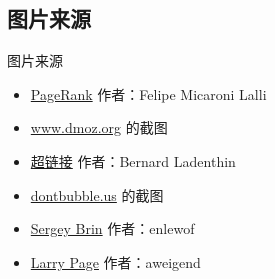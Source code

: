 \subsection{图片来源}
\begin{frame}{图片来源}
    \begin{itemize}
	\item \href{https://commons.wikimedia.org/wiki/File:PageRank-hi-res.png}{PageRank} 作者：Felipe Micaroni Lalli
	\item \href{http://www.dmoz.org}{www.dmoz.org} 的截图
	\item \href{https://commons.wikimedia.org/wiki/File:Hyperlink-Wikipedia.svg}{超链接} 作者：Bernard Ladenthin
	\item \href{http://dontbubble.us}{dontbubble.us} 的截图
        \item \href{http://commons.wikimedia.org/wiki/File:Sergey_Brin.JPG}{Sergey Brin} 作者：enlewof
        \item \href{http://commons.wikimedia.org/wiki/File:Larry_Page_laughs.jpg}{Larry Page} 作者：aweigend
    \end{itemize}
\end{frame}